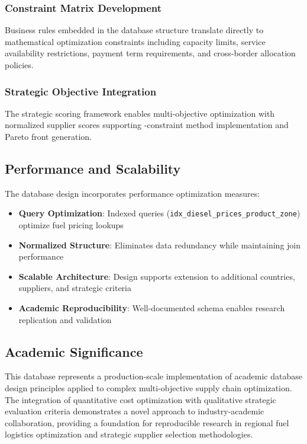 \subsubsection{Constraint Matrix Development}
Business rules embedded in the database structure translate directly to mathematical optimization constraints including capacity limits, service availability restrictions, payment term requirements, and cross-border allocation policies.

\subsubsection{Strategic Objective Integration}
The strategic scoring framework enables multi-objective optimization with normalized supplier scores supporting \epsilon-constraint method implementation and Pareto front generation.

\subsection{Performance and Scalability}
The database design incorporates performance optimization measures:
\begin{itemize}
    \item \textbf{Query Optimization}: Indexed queries (\texttt{idx\_diesel\_prices\_product\_zone}) optimize fuel pricing lookups
    \item \textbf{Normalized Structure}: Eliminates data redundancy while maintaining join performance
    \item \textbf{Scalable Architecture}: Design supports extension to additional countries, suppliers, and strategic criteria
    \item \textbf{Academic Reproducibility}: Well-documented schema enables research replication and validation
\end{itemize}

\subsection{Academic Significance}
This database represents a production-scale implementation of academic database design principles applied to complex multi-objective supply chain optimization. The integration of quantitative cost optimization with qualitative strategic evaluation criteria demonstrates a novel approach to industry-academic collaboration, providing a foundation for reproducible research in regional fuel logistics optimization and strategic supplier selection methodologies.

